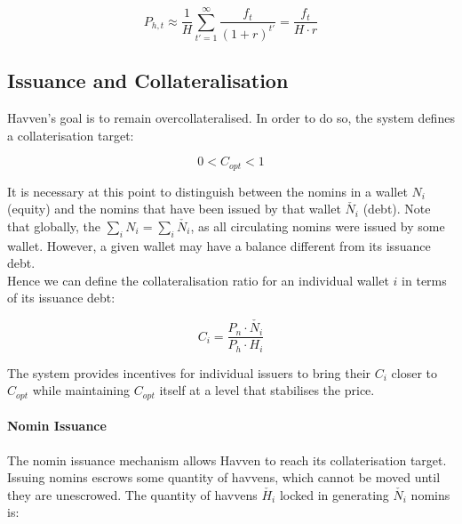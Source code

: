 \begin{equation}
    P_{h,t} \approx \frac{1}{H} \sum_{t'=1}^{\infty} \frac{f_t}{(1 + r)^{t'}} = \frac{f_t}{H \cdot r}
\end{equation}

\newpage

\subsection{Issuance and Collateralisation} 


\noindent Havven's goal is to remain overcollateralised. In order to do so, the system defines a collaterisation target:

\begin{equation}
0 < C_{opt} < 1  \label{eq:2}
\end{equation}

\noindent It is necessary at this point to distinguish between the nomins in a wallet $N_i$ (equity) and the nomins that have been issued by that wallet $\check{N_i}$ (debt). Note that globally, the $\sum_{i}N_i = \sum_{i}\check{N_i}$, as all circulating nomins were issued by some wallet. However, a given wallet may have a balance different from its issuance debt.\\

\noindent Hence we can define the collateralisation ratio for an individual wallet $i$ in terms of its issuance debt:

\begin{equation}
C_i = \frac{P_n \cdot \check{N_i}}{P_h \cdot H_i}  \label{eq:3}
\end{equation}

\noindent The system provides incentives for individual issuers to bring their $C_i$ closer to $C_{opt}$ while maintaining $C_{opt}$ itself at a level that stabilises the price.

\paragraph{Nomin Issuance}

\noindent The nomin issuance mechanism allows Havven to reach its collaterisation target. Issuing nomins escrows some quantity of havvens, which cannot be moved until they are unescrowed. The quantity of havvens $\check{H_i}$ locked in generating $\check{N_i}$ nomins is:

